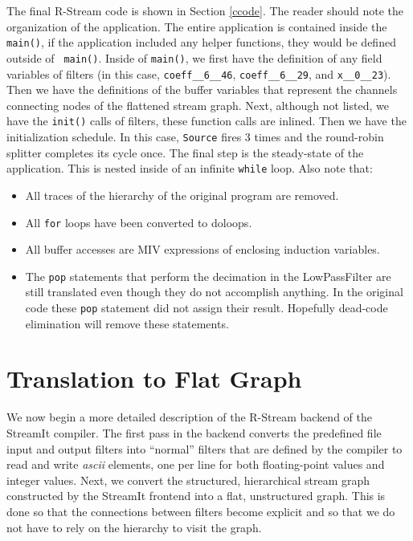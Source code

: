\documentclass[10pt, letterpaper, onecolumn]{article}
\begin{document}
The final R-Stream code is shown in Section \ref{ccode}.  The reader
should note the organization of the application.  The entire
application is contained inside the {\tt main()}, if the application
included any helper functions, they would be defined outside of {\tt
  main()}.  Inside of {\tt main()}, we first have the definition of
any field variables of filters (in this case, {\tt  coeff\_\_6\_\_46},
{\tt coeff\_\_6\_\_29}, and {\tt x\_\_0\_\_23}).  Then we have the definitions
of the buffer variables that represent the channels connecting nodes of
the flattened stream graph.  Next, although not listed, we have the 
{\tt init()} calls of filters, these function calls are inlined.
Then we have the initialization schedule.  In this case, {\tt Source}
fires 3 times and the round-robin splitter completes its cycle once.
The final step is the steady-state of the application.  This is nested
inside of an infinite {\tt while} loop.  Also note that:

\begin{itemize}
\item All traces of the hierarchy of the original program are removed.
\item All {\tt for} loops have been converted to {doloop}s.
\item All buffer accesses are MIV expressions of enclosing induction
  variables.
\item The {\tt pop} statements that perform the decimation in the
  LowPassFilter are still translated even though they do not
  accomplish anything.  In the original code these {\tt pop} statement
  did not assign their result.  Hopefully dead-code elimination will
  remove these statements.
\end{itemize}

\section{Translation to Flat Graph}
We now begin a more detailed description of the R-Stream backend of
the StreamIt compiler.  The first pass in the backend converts the
predefined file input and output filters into ``normal'' filters that
are defined by the compiler to read and write {\em ascii} elements,
one per line for both floating-point values and integer values.  Next,
we convert the structured, hierarchical stream graph constructed by
the StreamIt frontend into a flat, unstructured graph.  This is done
so that the connections between filters become explicit and so that we
do not have to rely on the hierarchy to visit the graph.
\end{document}
